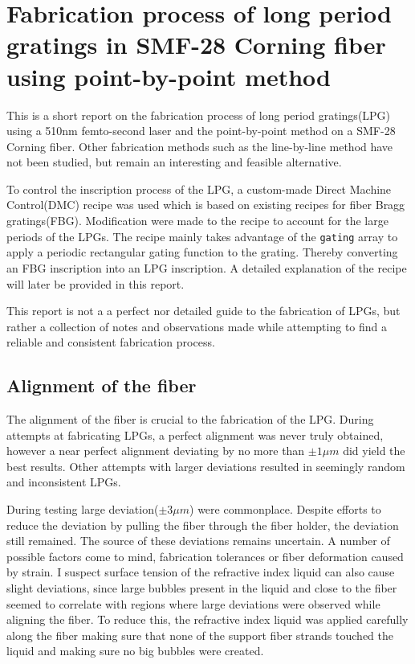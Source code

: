 \documentclass[11pt, openright]{book}
\begin{document}


%
    
\pagestyle{plain}
    \newpage

    \section*{Fabrication process of long period gratings in SMF-28 Corning fiber using point-by-point method}
    This is a short report on the fabrication process of long period gratings(LPG) using a 510nm femto-second laser and the point-by-point method on a SMF-28 Corning fiber. Other fabrication methods such as the line-by-line method have not been studied, but remain an  interesting and feasible alternative. 

    To control the inscription process of the LPG, a custom-made Direct Machine Control(DMC) recipe was used which is based on existing recipes for fiber Bragg gratings(FBG). Modification were made to the recipe to account for the large periods of the LPGs. The recipe mainly takes advantage of the \texttt{gating} array to apply a periodic rectangular gating function to the grating. Thereby converting an FBG inscription into an LPG inscription. A detailed explanation of the recipe will later be provided in this report.

    This report is not a a perfect nor detailed guide to the fabrication of LPGs, but rather a collection of notes and observations made while attempting to find a reliable and consistent fabrication process. 

        \subsection*{Alignment of the fiber}

        The alignment of the fiber is crucial to the fabrication of the LPG. During attempts at fabricating LPGs, a perfect alignment was never truly obtained, however a near perfect alignment deviating by no more than $\pm1\mu m$ did yield the best results. Other attempts with larger deviations resulted in seemingly random and inconsistent LPGs.
        
        During testing large deviation($\pm 3\mu m$) were commonplace. Despite efforts to reduce the deviation by pulling the fiber through the fiber holder, the deviation still remained. The source of these deviations remains uncertain. A number of possible factors come to mind, fabrication tolerances or fiber deformation caused by strain. I suspect surface tension of the refractive index liquid can also cause slight deviations, since large bubbles present in the liquid and close to the fiber seemed to correlate with regions where large deviations were observed while aligning the fiber. To reduce this, the refractive index liquid was applied carefully along the fiber making sure that none of the support fiber strands touched the liquid and making sure no big bubbles were created.
\end{document}
